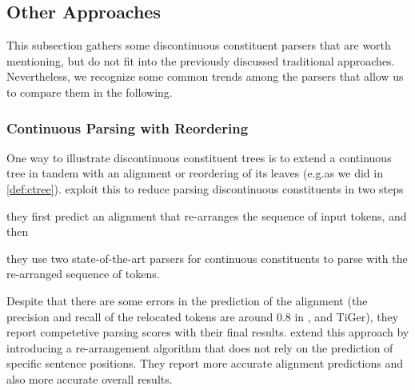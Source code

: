 \documentclass[../document.tex]{subfiles}
\begin{document}
    \subsection{Other Approaches}\label{sec:literature:others}
    This subsection gathers some discontinuous constituent parsers that are worth mentioning, but do not fit into the previously discussed traditional approaches.
    Nevertheless, we recognize some common trends among the parsers that allow us to compare them in the following.

    \subsubsection*{Continuous Parsing with Reordering}
    One way to illustrate discontinuous constituent trees is to extend a continuous tree in tandem with an alignment or reordering of its leaves (e.g.\@  as we did in \cref{def:ctree}).
    \citet{FerGon21a} exploit this to reduce parsing discontinuous constituents in two steps
    \begin{inparaenum}[]
        \item they first predict an alignment that re-arranges the sequence of input tokens, and then
        \item they use two state-of-the-art parsers for continuous constituents to parse with the re-arranged sequence of tokens.
    \end{inparaenum}
    Despite that there are some errors in the prediction of the alignment (the precision and recall of the relocated tokens are around $0.8$ in ,  and TiGer), they report competetive parsing scores with their final results.
    \citet{Sun22} extend this approach by introducing a re-arrangement algorithm that does not rely on the prediction of specific sentence positions.
    They report more accurate alignment predictions and also more accurate overall results.
\end{document}
